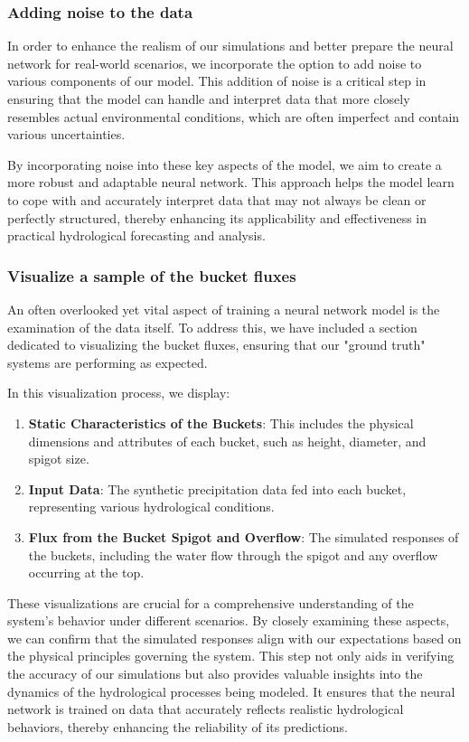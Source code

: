 \documentclass{article}
\begin{document}
\subsubsection{Adding noise to the data}
\label{methods:noise}
In order to enhance the realism of our simulations and better prepare the neural network for real-world scenarios, we incorporate the option to add noise to various components of our model. This addition of noise is a critical step in ensuring that the model can handle and interpret data that more closely resembles actual environmental conditions, which are often imperfect and contain various uncertainties. 

By incorporating noise into these key aspects of the model, we aim to create a more robust and adaptable neural network. This approach helps the model learn to cope with and accurately interpret data that may not always be clean or perfectly structured, thereby enhancing its applicability and effectiveness in practical hydrological forecasting and analysis.

\subsubsection{Visualize a sample of the bucket fluxes}
\label{methods:viz}
An often overlooked yet vital aspect of training a neural network model is the examination of the data itself. To address this, we have included a section dedicated to visualizing the bucket fluxes, ensuring that our "ground truth" systems are performing as expected.

In this visualization process, we display:

\begin{enumerate} 
    \item \textbf{Static Characteristics of the Buckets}: This includes the physical dimensions and attributes of each bucket, such as height, diameter, and spigot size.
    \item \textbf{Input Data}: The synthetic precipitation data fed into each bucket, representing various hydrological conditions.
    \item \textbf{Flux from the Bucket Spigot and Overflow}: The simulated responses of the buckets, including the water flow through the spigot and any overflow occurring at the top.
\end{enumerate}

These visualizations are crucial for a comprehensive understanding of the system's behavior under different scenarios. By closely examining these aspects, we can confirm that the simulated responses align with our expectations based on the physical principles governing the system. This step not only aids in verifying the accuracy of our simulations but also provides valuable insights into the dynamics of the hydrological processes being modeled. It ensures that the neural network is trained on data that accurately reflects realistic hydrological behaviors, thereby enhancing the reliability of its predictions.
\end{document}
